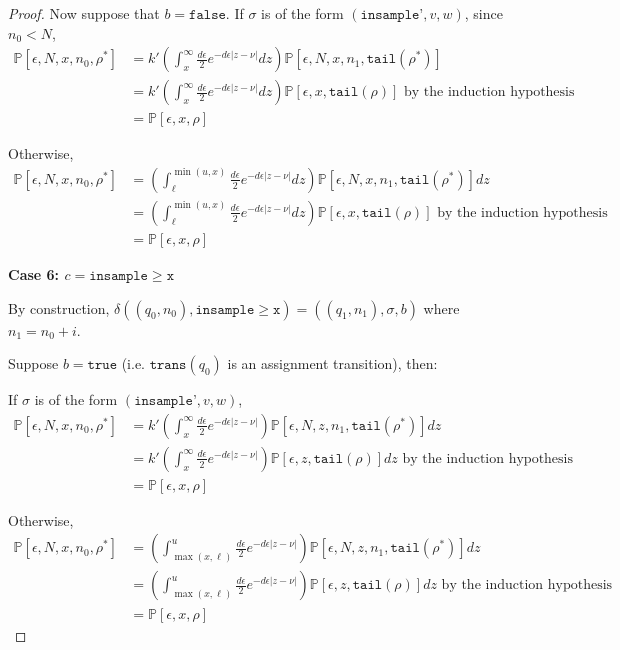 \documentclass[12pt]{article}
\newcommand{\PP}{\mathbb{P}}
\newcommand{\gguard}{\texttt{insample}\geq \texttt{x}}
\theoremstyle{definition}
\begin{document}
\begin{proof}
	Now suppose that $b = \texttt{false}$. If $\sigma$ is of the form $(\texttt{insample'}, v, w)$, since $n_0 < N$, 
	\begin{align*}
		\PP[\epsilon, N, x, n_0, \rho^*] &= k'\left(\int_x^\infty\frac{d\epsilon}{2}e^{-d\epsilon|z-\nu|}dz\right)\PP[\epsilon, N, x, n_1, \texttt{tail}(\rho^*)]\\
		&= k'\left(\int_x^\infty\frac{d\epsilon}{2}e^{-d\epsilon|z-\nu|}dz\right)\PP[\epsilon, x, \texttt{tail}(\rho)] \text{ by the induction hypothesis }\\
		&= \PP[\epsilon, x, \rho]
	\end{align*}

	Otherwise, 
	\begin{align*}
		\PP[\epsilon, N, x, n_0, \rho^*] &= \left(\int_{\ell}^{\min(u, x)}\frac{d\epsilon}{2}e^{-d\epsilon|z-\nu|}dz\right)\PP[\epsilon, N, x, n_1, \texttt{tail}(\rho^*)]dz \\
		&= \left(\int_{\ell}^{\min(u, x)}\frac{d\epsilon}{2}e^{-d\epsilon|z-\nu|}dz\right)\PP[\epsilon, x, \texttt{tail}(\rho)] \text{ by the induction hypothesis }\\
		&= \PP[\epsilon, x, \rho]
	\end{align*}


	\textbf{Case 6: $c = \gguard$}
	
	By construction, $\delta((q_0, n_0), \gguard) = ((q_1, n_1), \sigma, b)$ where $n_1 = n_0+i$. 

	Suppose $b = \texttt{true}$ (i.e. $\texttt{trans}(q_0)$ is an assignment transition), then:

	If $\sigma$ is of the form $(\texttt{insample'}, v, w)$, 
		\begin{align*}
			\PP[\epsilon, N, x, n_0, \rho^*] &= k'\left(\int_x^\infty\frac{d\epsilon}{2}e^{-d\epsilon|z-\nu|}\right)\PP[\epsilon, N, z, n_1, \texttt{tail}(\rho^*)]dz \\
			&= k'\left(\int_x^\infty\frac{d\epsilon}{2}e^{-d\epsilon|z-\nu|}\right)\PP[\epsilon, z, \texttt{tail}(\rho)]dz \text{ by the induction hypothesis }\\
			&= \PP[\epsilon, x, \rho]
		\end{align*}

	
	Otherwise, 
	\begin{align*}
		\PP[\epsilon, N, x, n_0, \rho^*] &= \left(\int_{\max(x, \ell)}^u\frac{d\epsilon}{2}e^{-d\epsilon|z-\nu|}\right)\PP[\epsilon, N, z, n_1, \texttt{tail}(\rho^*)]dz \\
		&= \left(\int_{\max(x, \ell)}^u\frac{d\epsilon}{2}e^{-d\epsilon|z-\nu|}\right)\PP[\epsilon, z, \texttt{tail}(\rho)]dz \text{ by the induction hypothesis }\\
		&= \PP[\epsilon, x, \rho]
	\end{align*}


\end{proof}
\end{document}
